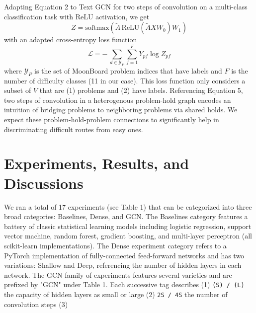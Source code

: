 \documentclass{article}
\begin{document}
Adapting Equation 2 to Text GCN for two steps of convolution on a multi-class classification task with ReLU activation, we get
\begin{equation}
Z = \text{softmax}(\widetilde{A}\,\text{ReLU}(\widetilde{A}XW_{0})W_{1})
\end{equation}
with an adapted cross-entropy loss function
\begin{equation}
\mathcal{L} = -\,\sum_{d\in\mathcal{Y}_P} \sum_{f=1}^{F} Y_{pf}\log Z_{pf}
\end{equation}
where $\mathcal{Y}_P$ is the set of MoonBoard problem indices that have labels and $F$ is the number of difficulty classes (11 in our case). This loss function only considers a subset of $V$ that are (1) problems and (2) have labels. Referencing Equation 5, two steps of convolution in a heterogenous problem-hold graph encodes an intuition of bridging problems to neighboring problems via shared holds. We expect these problem-hold-problem connections to significantly help in discriminating difficult routes from easy ones. 

\section{Experiments, Results, and Discussions}
We ran a total of 17 experiments (see Table 1) that can be categorized into three broad categories: Baselines, Dense, and GCN. The Baselines category features a battery of classic statistical learning models including logistic regression, support vector machine, random forest, gradient boosting, and multi-layer perceptron (all scikit-learn implementations). The Dense experiment category refers to a PyTorch implementation of fully-connected feed-forward networks and has two variations: Shallow and Deep, referencing the number of hidden layers in each network. The GCN family of experiments features several varieties and are prefixed by "GCN" under Table 1. Each successive tag describes (1) \texttt{(S) / (L)} the capacity of hidden layers as small or large (2) \texttt{2S / 4S} the number of convolution steps (3) 
\end{document}
